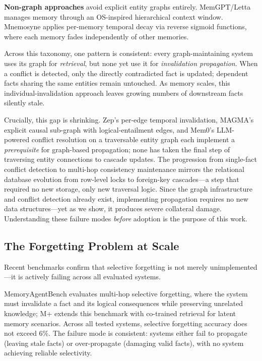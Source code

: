 \documentclass[11pt]{article}
\begin{document}
\textbf{Non-graph approaches} avoid explicit entity graphs entirely.
MemGPT/Letta \citep{memgpt_2023} manages memory through an OS-inspired hierarchical context window.
Mnemosyne \citep{mnemosyne_2025} applies per-memory temporal decay via reverse sigmoid functions, where each memory fades independently of other memories.

Across this taxonomy, one pattern is consistent: every graph-maintaining system uses its graph for \textit{retrieval}, but none yet use it for \textit{invalidation propagation}.
When a conflict is detected, only the directly contradicted fact is updated; dependent facts sharing the same entities remain untouched.
As memory scales, this individual-invalidation approach leaves growing numbers of downstream facts silently stale.

Crucially, this gap is shrinking.
Zep's per-edge temporal invalidation, MAGMA's explicit causal sub-graph with logical-entailment edges, and Mem0's LLM-powered conflict resolution on a traversable entity graph each implement a \textit{prerequisite} for graph-based propagation; none has taken the final step of traversing entity connections to cascade updates.
The progression from single-fact conflict detection to multi-hop consistency maintenance mirrors the relational database evolution from row-level locks to foreign-key cascades---a step that required no new storage, only new traversal logic.
Since the graph infrastructure and conflict detection already exist, implementing propagation requires no new data structures---yet as we show, it produces severe collateral damage.
Understanding these failure modes \textit{before} adoption is the purpose of this work.

\subsection{The Forgetting Problem at Scale}
\label{sec:bg_forgetting}

Recent benchmarks confirm that selective forgetting is not merely unimplemented---it is actively failing across all evaluated systems.

MemoryAgentBench \citep{memoryagentbench_2026} evaluates multi-hop selective forgetting, where the system must invalidate a fact and its logical consequences while preserving unrelated knowledge; M+ \citep{mplus_2025} extends this benchmark with co-trained retrieval for latent memory scenarios.
Across all tested systems, selective forgetting accuracy does not exceed 6\%.
The failure mode is consistent: systems either fail to propagate (leaving stale facts) or over-propagate (damaging valid facts), with no system achieving reliable selectivity.
\end{document}
